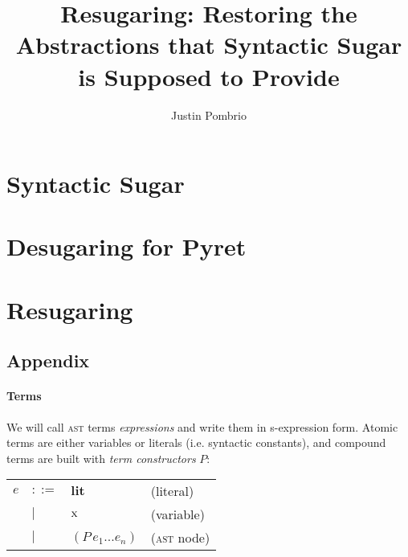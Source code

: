 \documentclass[
  11pt,
  paper=letter,
  footinclude=true,
  headinclude=true,
  american
]{scrbook}
\makeatletter
\newenvironment{Table}
  {\begin{center}\begin{tabular}{l l l @{\quad}l}}
  {\end{tabular}\end{center}}
\makeatother
\begin{document}
\author{Justin Pombrio}
\title{Resugaring: Restoring the Abstractions that Syntactic Sugar is Supposed to Provide}
\maketitle


\part{Syntactic Sugar}


\part{Desugaring for Pyret}

\part{Resugaring}






\chapter{Appendix}


\newcommand{\lit}[1]{\textbf{#1}}
\newcommand{\expr}[2]{(#1\,#2)}
\newcommand{\var}[1]{\textrm{\textsc{#1}}}

\newcommand{\exprs}[3]{(#1\,#2\,#3^{*})}
\newcommand{\production}[2]{#1 \leftarrow #2}
\newcommand{\saysG}[3]{#1 \vdash #2\,:\,#3}


\subsection{Terms}

We will call \textsc{ast} terms \emph{expressions} and write them in
s-expression form. Atomic terms are either variables or literals
(i.e. syntactic constants), and compound terms are built with
\emph{term constructors} $P$:

\begin{Table}
  $e$
  &$::=$& $\lit{lit}$ &(literal) \\
  &$|$&   $\var{x}$ &(variable) \\
  &$|$&   $\expr{P}{e_1 ... e_n}$ &(\textsc{ast} node)
\end{Table}
\end{document}
